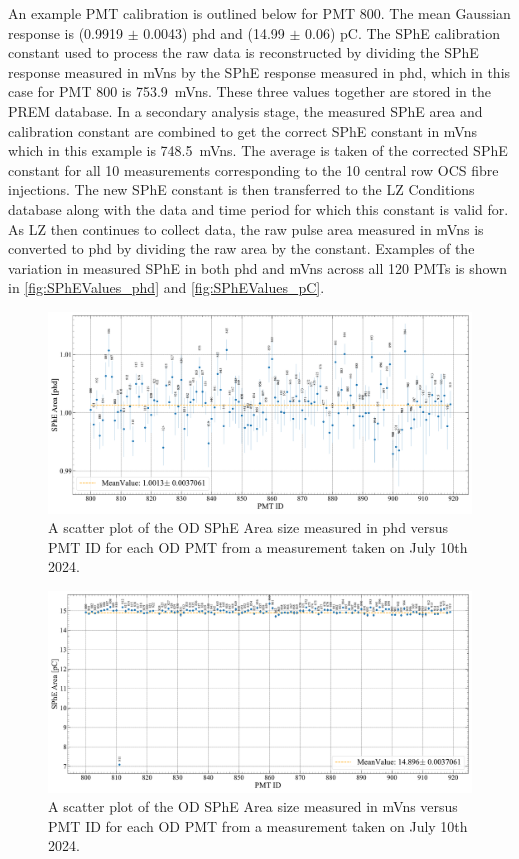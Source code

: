 An example PMT calibration is outlined below for PMT 800. The mean Gaussian response is (0.9919 $\pm$ 0.0043) phd and (14.99 $\pm$ 0.06) pC. The SPhE calibration constant used to process the raw data is reconstructed by dividing the SPhE response measured in mVns by the SPhE response measured in phd, which in this case for PMT 800 is 753.9~mVns. These three values together are stored in the PREM database. In a secondary analysis stage, the measured SPhE area and calibration constant are combined to get the correct SPhE constant in mVns which in this example is 748.5~mVns. The average is taken of the corrected SPhE constant for all 10 measurements corresponding to the 10 central row OCS fibre injections. The new SPhE constant is then transferred to the LZ Conditions database along with the data and time period for which this constant is valid for. As LZ then continues to collect data, the raw pulse area measured in mVns is converted to phd by dividing the raw area by the constant. Examples of the variation in measured SPhE in both phd and mVns across all 120 PMTs is shown in \autoref{fig:SPhEValues_phd} and \autoref{fig:SPhEValues_pC}.
\begin{figure}
    \centering
    \includegraphics[width=\textwidth]{figures/ODCommissioning/SPHE_phd_2024-7-10.pdf}
    \caption{A scatter plot of the OD SPhE Area size measured in phd versus PMT ID for each OD PMT from a measurement taken on July 10th 2024.}
    \label{fig:SPhEValues_phd}
\end{figure}
\begin{figure}
    \centering
    \includegraphics[width=\textwidth]{figures/ODCommissioning/SPHE_pC_2024-7-10.pdf}
    \caption{A scatter plot of the OD SPhE Area size measured in mVns versus PMT ID for each OD PMT from a measurement taken on July 10th 2024.}
    \label{fig:SPhEValues_pC}
\end{figure}


